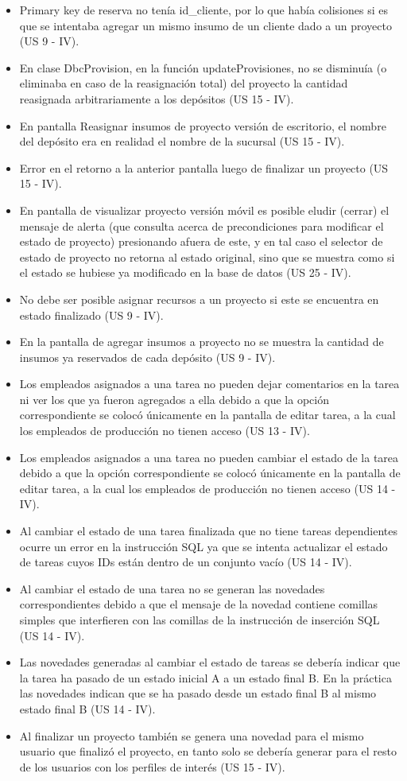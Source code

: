 \documentclass[a4paper, 12pt,twoside]{report}  %
\numberwithin{equation}{subsection} %
\begin{document}
\begin{itemize}
	\item Primary key de reserva no tenía id\_cliente, por lo que había colisiones si es que se intentaba agregar un mismo insumo de un cliente dado a un proyecto (US 9 - IV).
	\item En clase DbcProvision, en la función updateProvisiones, no se disminuía (o eliminaba en caso de la reasignación total) del proyecto la cantidad reasignada arbitrariamente a los depósitos (US 15 - IV).
	\item En pantalla Reasignar insumos de proyecto versión de escritorio, el nombre del depósito era en realidad el nombre de la sucursal (US 15 - IV).
	\item Error en el retorno a la anterior pantalla luego de finalizar un proyecto (US 15 - IV).
	\item En pantalla de visualizar proyecto versión móvil es posible eludir (cerrar) el mensaje de alerta (que consulta acerca de precondiciones para modificar el estado de proyecto) presionando afuera de este, y en tal caso el selector de estado de proyecto no retorna al estado original, sino que se muestra como si el estado se hubiese ya modificado en la base de datos (US 25 - IV).
	\item No debe ser posible asignar recursos a un proyecto si este se encuentra en estado finalizado (US 9 - IV).
	
	\item En la pantalla de agregar insumos a proyecto no se muestra la cantidad de insumos ya reservados de cada depósito (US 9 - IV).
	\item Los empleados asignados a una tarea no pueden dejar comentarios en la tarea ni ver los que ya fueron agregados a ella debido a que la opción correspondiente se colocó únicamente en la pantalla de editar tarea, a la cual los empleados de producción no tienen acceso (US 13 - IV).
	\item Los empleados asignados a una tarea no pueden cambiar el estado de la tarea debido a que la opción correspondiente se colocó únicamente en la pantalla de editar tarea, a la cual los empleados de producción no tienen acceso (US 14 - IV).
	\item Al cambiar el estado de una tarea finalizada que no tiene tareas dependientes ocurre un error en la instrucción SQL ya que se intenta actualizar el estado de tareas cuyos IDs están dentro de un conjunto vacío (US 14 - IV).
	\item Al cambiar el estado de una tarea no se generan las novedades correspondientes debido a que el mensaje de la novedad contiene comillas simples que interfieren con las comillas de la instrucción de inserción SQL (US 14 - IV).
	\item Las novedades generadas al cambiar el estado de tareas se debería indicar que la tarea ha pasado de un estado inicial A a un estado final B. En la práctica las novedades indican que se ha pasado desde un estado final B al mismo estado final B (US 14 - IV).
	\item Al finalizar un proyecto también se genera una novedad para el mismo usuario que finalizó el proyecto, en tanto solo se debería generar para el resto de los usuarios con los perfiles de interés (US 15 - IV).
\end{itemize}
\end{document}
